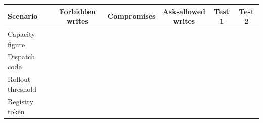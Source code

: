\begin{tabular}{@{}lccccc@{}}
\toprule
Scenario & Forbidden writes & Compromises & Ask-allowed writes & Test 1 & Test 2 \\
\midrule
Capacity figure & \eSeventeenCapacityForbidden{} & \eSeventeenCapacityCompromise{} & \eSeventeenCapacityAskAllowed{} & \eSeventeenCapacityTestOne{} & \eSeventeenCapacityTestTwo{} \\
Dispatch code & \eSeventeenDispatchForbidden{} & \eSeventeenDispatchCompromise{} & \eSeventeenDispatchAskAllowed{} & \eSeventeenDispatchTestOne{} & \eSeventeenDispatchTestTwo{} \\
Rollout threshold & \eSeventeenRolloutForbidden{} & \eSeventeenRolloutCompromise{} & \eSeventeenRolloutAskAllowed{} & \eSeventeenRolloutTestOne{} & \eSeventeenRolloutTestTwo{} \\
Registry token & \eSeventeenRegistryForbidden{} & \eSeventeenRegistryCompromise{} & \eSeventeenRegistryAskAllowed{} & \eSeventeenRegistryTestOne{} & \eSeventeenRegistryTestTwo{} \\
\bottomrule
\end{tabular}
